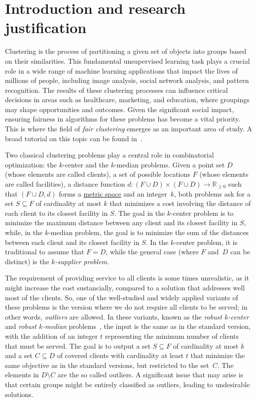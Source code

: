 \documentclass[12pt]{article}
\begin{document}
\section{Introduction and research justification} %
Clustering is the process of partitioning a given set of objects into groups based on their similarities. 
This fundamental unsupervised learning task plays a crucial role in a wide range of machine learning applications that impact the lives of millions of people, including image analysis, social network analysis, and pattern recognition. 
The results of these clustering processes can influence critical decisions in areas such as healthcare, marketing, and education, where groupings may shape opportunities and outcomes.
Given the significant social impact, ensuring fairness in algorithms for these problems has become a vital priority. 
This is where the field of \emph{fair clustering} emerges as an important area of study.
A broad tutorial on this topic can be found in~\cite{FairClusteringTutorial}.

Two classical clustering problems play a central role in combinatorial optimization: the $k$-center and the $k$-median problems. 
Given a point set $D$ (whose elements are called clients), a set of possible locations $F$ (whose elements are called facilities), a distance function $d : (F \cup D) \times (F \cup D) \rightarrow \mathbb{R}_{\geq 0}$ such that $(F\cup D, d)$ forms a \href{https://en.wikipedia.org/wiki/Metric_space}{metric space} and an integer~$k$, both problems ask for a set $S \subseteq F$ of cardinality at most $k$ that minimizes a cost involving the distance of each client to its closest facility in $S$.
The goal in the $k$-center problem is to minimize the maximum distance between any client and its closest facility in $S$, while, in the $k$-median problem, the goal is to minimize the sum of the distances between each client and its closest facility in $S$.
In the $k$-center problem, it is traditional to assume that $F=D$, while the general case (where $F$ and~$D$ can be distinct) is the \emph{$k$-supplier problem}.

The requirement of providing service to all clients is some times unrealistic, as it might increase the cost sustancially, compared to a solution that addresses well most of the clients. 
So, one of the well-studied and widely applied variants of these problems is the version where we do not require all clients to be served; in other words, \emph{outliers} are allowed. 
In these variants, known as the \emph{robust $k$-center} and \emph{robust $k$-median} problems~\cite{CharikarKMN2001}, the input is the same as in the standard version, with the addition of an integer $t$ representing the minimum number of clients that must be served. 
The goal is to output a set $S \subseteq F$ of cardinality at most $k$ and a set $C \subseteq D$ of covered clients with cardinality at least $t$ that minimize the same objective as in the standard versions, but restricted to the set~$C$.  The elements in $D \setminus C$ are the so called outliers.  A significant issue that may arise is that certain groups might be entirely classified as outliers, leading to undesirable solutions.
\end{document}
